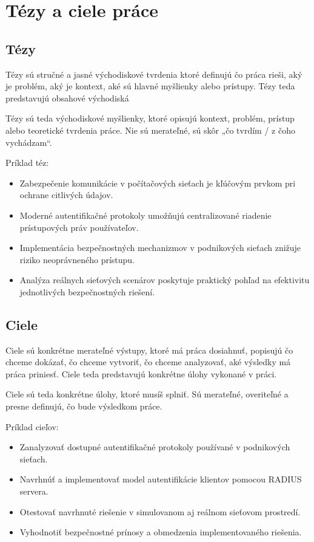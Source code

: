 \section*{Tézy a ciele \typpracerod{} práce}

\normalsize

\subsection*{Tézy}

Tézy sú stručné a jasné východiskové tvrdenia ktoré definujú čo práca rieši, aký je problém, aký je kontext, aké sú hlavné myšlienky alebo prístupy. Tézy teda predstavujú obsahové východiská

Tézy sú teda východiskové myšlienky, ktoré opisujú kontext, problém, prístup alebo teoretické tvrdenia práce.
Nie sú merateľné, sú skôr „čo tvrdím / z čoho vychádzam“.

Príklad téz:

\begin{itemize}
	\item Zabezpečenie komunikácie v počítačových sieťach je kľúčovým prvkom pri ochrane citlivých údajov.
	\item Moderné autentifikačné protokoly umožňujú centralizované riadenie prístupových práv používateľov.
	\item Implementácia bezpečnostných mechanizmov v podnikových sieťach znižuje riziko neoprávneného prístupu.
	\item Analýza reálnych sieťových scenárov poskytuje praktický pohľad na efektivitu jednotlivých bezpečnostných riešení.
\end{itemize}


\subsection*{Ciele}

Ciele sú konkrétne merateľné výstupy, ktoré má práca dosiahnuť, popisujú čo chceme dokázať, čo chceme vytvoriť, čo chceme analyzovať, aké výsledky má práca priniesť. Ciele teda predstavujú konkrétne úlohy vykonané v práci.

Ciele sú teda konkrétne úlohy, ktoré musíš splniť. Sú merateľné, overiteľné a presne definujú, čo bude výsledkom práce.

Príklad cieľov: 

\begin{itemize}
	\item Zanalyzovať dostupné autentifikačné protokoly používané v podnikových sieťach.
	\item Navrhnúť a implementovať model autentifikácie klientov pomocou RADIUS servera.
	\item Otestovať navrhnuté riešenie v simulovanom aj reálnom sieťovom prostredí.
	\item Vyhodnotiť bezpečnostné prínosy a obmedzenia implementovaného riešenia.
\end{itemize}

\newpage